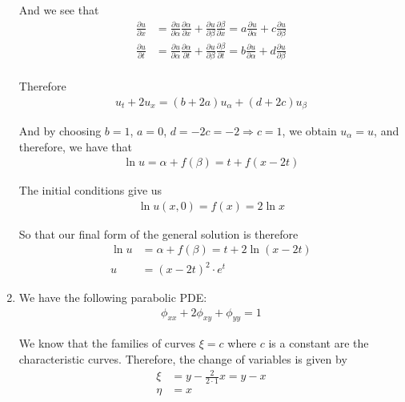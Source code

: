 \begin{enumerate}[label=(\roman*),leftmargin=*,itemsep=0mm]
    And we see that
    \begin{align*}
        \frac{\partial{u}}{\partial{x}} 
        &= \frac{\partial{u}}{\partial{\alpha}} \frac{\partial{\alpha}}{\partial{x}}
        +  \frac{\partial{u}}{\partial{\beta}}  \frac{\partial{\beta}}{\partial{x}}
        =  a\frac{\partial{u}}{\partial{\alpha}} + c\frac{\partial{u}}{\partial{\beta}} \\
        \frac{\partial{u}}{\partial{t}} 
        &= \frac{\partial{u}}{\partial{\alpha}} \frac{\partial{\alpha}}{\partial{t}}
        +  \frac{\partial{u}}{\partial{\beta}}  \frac{\partial{\beta}}{\partial{t}}
        =  b\frac{\partial{u}}{\partial{\alpha}} + d\frac{\partial{u}}{\partial{\beta}} \\
    \end{align*}
    
    Therefore
    \begin{align*}
        u_t + 2u_x = (b + 2a)u_\alpha + (d+2c)u_\beta
    \end{align*}
    
    And by choosing $b = 1$, $a=0$, $d = -2c = -2 \Rightarrow c = 1$, we obtain $u_\alpha = u$, and therefore, we have that
    \begin{align*}
        \ln u = \alpha + f(\beta) = t + f(x-2t)
    \end{align*}
    
    The initial conditions give us
    \begin{align*}
        \ln u(x,0) = f(x) = 2 \ln x
    \end{align*}
    
    So that our final form of the general solution is therefore
    \begin{align*}
        \ln u &= \alpha + f(\beta) = t + 2 \ln (x-2t) \\
        u &= (x-2t)^2 \cdot e^t
    \end{align*}
    
    \item We have the following parabolic PDE:
    \begin{align*}
        \phi_{xx} + 2\phi_{xy} + \phi_{yy} = 1
    \end{align*}
    
    We know that the families of curves $\xi = c$ where $c$ is a constant are the characteristic curves.  Therefore, the change of variables is given by
    \begin{align*}
        \xi &= y - \frac{2}{2 \cdot 1}x = y - x \\
        \eta &= x
    \end{align*}
    

\end{enumerate}
